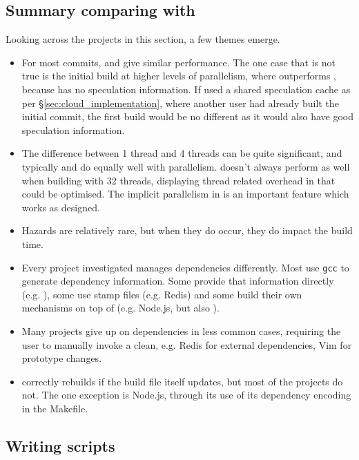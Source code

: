 \subsection{Summary comparing with \Make}

Looking across the projects in this section, a few themes emerge.

\begin{itemize}
\item For most commits, \Rattle and \Make give similar performance. The one case that is not true is the initial build at higher levels of parallelism, where \Make outperforms \Rattle, because \Rattle has no speculation information. If \Rattle used a shared speculation cache as per \S\ref{sec:cloud_implementation}, where another user had already built the initial commit, the first build would be no different as it would also have good speculation information.
\item The difference between 1 thread and 4 threads can be quite significant, and typically \Make and \Rattle do equally well with parallelism. \Rattle doesn't always perform as well when building with 32 threads, displaying thread related overhead in \Rattle that could be optimised. The implicit parallelism in \Rattle is an important feature which works as designed.  
\item Hazards are relatively rare, but when they do occur, they do impact the build time.
\item Every \Make project investigated manages dependencies differently. Most use \texttt{gcc} to generate dependency information. Some provide that information directly (e.g. \Fsatrace), some use stamp files (e.g. Redis) and some build their own mechanisms on top of \Make (e.g. Node.js, but also \citet[\S2]{hadrian}).
\item Many projects give up on dependencies in less common cases, requiring the user to manually invoke a clean, e.g. Redis for external dependencies, Vim for prototype changes.
\item \Rattle correctly rebuilds if the build file itself updates, but most of the \Make projects do not. The one exception is Node.js, through its use of its dependency encoding in the Makefile.
\end{itemize}


\subsection{Writing \Rattle scripts}
\label{sec:eval:writing_rattle}

